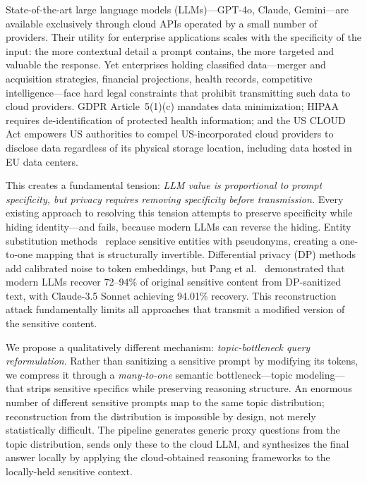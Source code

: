 \documentclass[sigconf,anonymous,review,balance=false]{acmart}
\begin{document}
State-of-the-art large language models (LLMs)---GPT-4o, Claude, Gemini---are available exclusively through cloud APIs operated by a small number of providers.
Their utility for enterprise applications scales with the specificity of the input: the more contextual detail a prompt contains, the more targeted and valuable the response.
Yet enterprises holding classified data---merger and acquisition strategies, financial projections, health records, competitive intelligence---face hard legal constraints that prohibit transmitting such data to cloud providers.
GDPR Article~5(1)(c) mandates data minimization; HIPAA requires de-identification of protected health information; and the US CLOUD Act empowers US authorities to compel US-incorporated cloud providers to disclose data regardless of its physical storage location, including data hosted in EU data centers.

This creates a fundamental tension: \emph{LLM value is proportional to prompt specificity, but privacy requires removing specificity before transmission.}
Every existing approach to resolving this tension attempts to preserve specificity while hiding identity---and fails, because modern LLMs can reverse the hiding.
Entity substitution methods~\cite{chen2023, albanese2026, agyemang2026, yang2025} replace sensitive entities with pseudonyms, creating a one-to-one mapping that is structurally invertible.
Differential privacy (DP) methods~\cite{yue2021, chen2023custext, tem2021, cape2025, inferdpt2023, dyntext2025, clusant2025} add calibrated noise to token embeddings, but Pang et al.~\cite{pang2024} demonstrated that modern LLMs recover 72--94\% of original sensitive content from DP-sanitized text, with Claude-3.5 Sonnet achieving 94.01\% recovery.
This reconstruction attack fundamentally limits all approaches that transmit a modified version of the sensitive content.

We propose a qualitatively different mechanism: \emph{topic-bottleneck query reformulation}.
Rather than sanitizing a sensitive prompt by modifying its tokens, we compress it through a \emph{many-to-one} semantic bottleneck---topic modeling---that strips sensitive specifics while preserving reasoning structure.
An enormous number of different sensitive prompts map to the same topic distribution; reconstruction from the distribution is impossible by design, not merely statistically difficult.
The pipeline generates generic proxy questions from the topic distribution, sends only these to the cloud LLM, and synthesizes the final answer locally by applying the cloud-obtained reasoning frameworks to the locally-held sensitive context.
\end{document}
